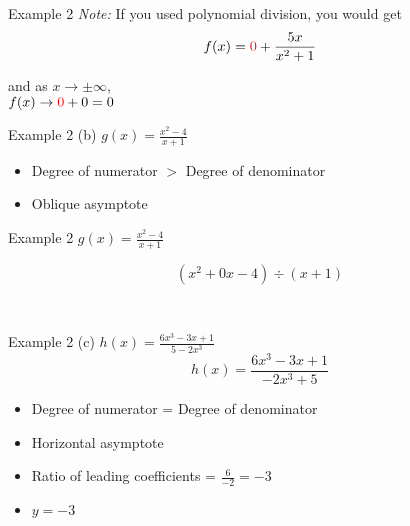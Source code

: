 \documentclass[t,usenames,dvipsnames]{beamer}
\begin{document}
\begin{frame}{Example 2}
\emph{Note:} If you used polynomial division, you would get \[f(x) = {\color{red}0} + \frac{5x}{x^2+1}\]

and as $x \to \pm \infty$,  \newline\\ $f(x) \to {\color{red}0} + 0 = 0$
\end{frame}

\begin{frame}{Example 2}
(b) \quad $g(x) = \frac{x^2-4}{x+1}$ \newline\\ \pause
\begin{itemize}
    \item Degree of numerator $>$ Degree of denominator \newline\\ \pause
    \item Oblique asymptote
\end{itemize}
\end{frame}

\begin{frame}{Example 2 \quad $g(x) = \tfrac{x^2-4}{x+1}$}

\[(x^2 + 0x - 4) \div (x + 1)\] 

\begin{center}
 \\[6pt]
\end{center}
\end{frame}

\begin{frame}{Example 2}
(c) \quad $h(x) = \frac{6x^3-3x+1}{5-2x^3}$ \pause
\[ h(x) = \frac{6x^3-3x+1}{-2x^3+5} \] \pause
\begin{itemize}
    \item Degree of numerator = Degree of denominator \newline\\ \pause
    \item Horizontal asymptote \newline\\ \pause
    \item Ratio of leading coefficients = $\tfrac{6}{-2} = -3$ \newline\\ \pause
    \item $y = -3$
\end{itemize}
\end{frame}
\end{document}
